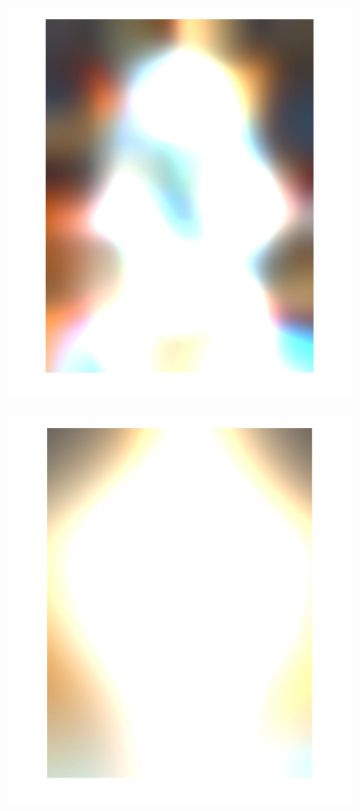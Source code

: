 \documentclass[a4paper]{iacas}
\begin{document}
\begin{figure}[!htbp]
\begin{subfigure}[b]{0.15\textwidth}
		\caption{}
		\label{fig:204}
	\end{subfigure}
	\begin{subfigure}[b]{0.15\textwidth}
		\includegraphics[width=\textwidth]{205.jpg}
		\caption{}
		\label{fig:205}
	\end{subfigure}
	\begin{subfigure}[b]{0.15\textwidth}
		\includegraphics[width=\textwidth]{206.jpg}
		\caption{}
		\label{fig:206}
	\end{subfigure}
	

\end{figure}
\end{document}
